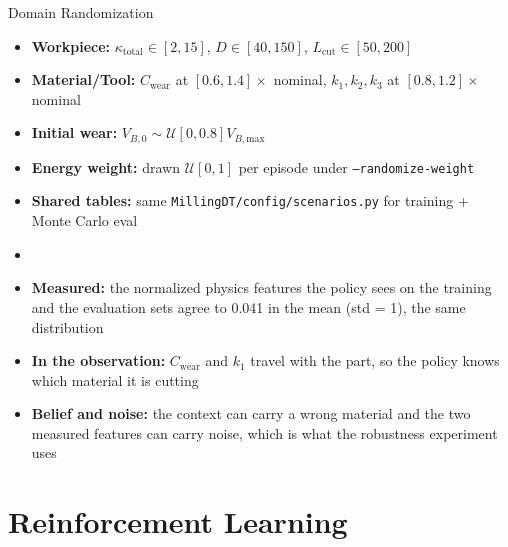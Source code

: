 ﻿\documentclass[11pt,aspectratio=169]{beamer}
\begin{document}
\begin{frame}{Domain Randomization}
    \begin{itemize}
        \item \textbf{Workpiece:} $\kappa_{\text{total}} \in [2,15]$, $D \in [40,150]$, $L_{\text{cut}} \in [50,200]$
        \item \textbf{Material/Tool:} $C_\text{wear}$ at $[0.6,1.4]\times$ nominal, $k_1, k_2, k_3$ at $[0.8,1.2]\times$ nominal
        \item \textbf{Initial wear:} $V_{B,0} \sim \mathcal{U}[0, 0.8] V_{B,\text{max}}$
        \item \textbf{Energy weight:} drawn $\mathcal{U}[0,1]$ per episode under \texttt{--randomize-weight}
        \item \textbf{Shared tables:} same \texttt{MillingDT/config/scenarios.py} for training + Monte Carlo eval
        \item \smallskip
        \item \textbf{Measured:} the normalized physics features the policy sees on the training and the evaluation sets agree to 0.041 in the mean (std = 1), the same distribution
        \item \textbf{In the observation:} $C_\text{wear}$ and $k_1$ travel with the part, so the policy knows which material it is cutting
        \item \textbf{Belief and noise:} the context can carry a wrong material and the two measured features can carry noise, which is what the robustness experiment uses
    \end{itemize}
\end{frame}

\section{Reinforcement Learning}
\end{document}
